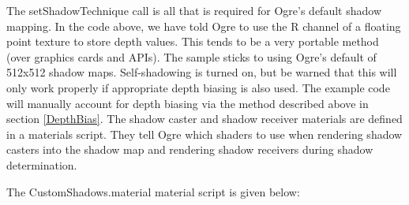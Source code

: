 \documentclass[]{article}  %
\begin{document}
The setShadowTechnique call is all that is required for Ogre's default shadow mapping.  
In the code above, we have told Ogre to use the R channel of a floating point texture to store depth values.  This tends to be a very portable method (over graphics cards and APIs).  The sample sticks to using Ogre's default of 512x512 shadow maps.  Self-shadowing is turned on, but be warned that this will only work properly if appropriate depth biasing is also used.  The example code will manually account for depth biasing via the method described above in section \ref{DepthBias}.  The shadow caster and shadow receiver materials are defined in a materials script.  They tell Ogre which shaders to use when rendering shadow casters into the shadow map and rendering shadow receivers during shadow determination.  

The CustomShadows.material material script is given below:
\end{document}
